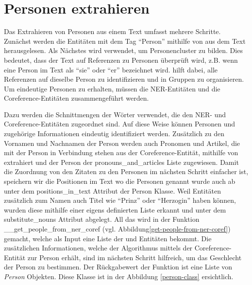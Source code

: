 \newpage
\section{Personen extrahieren}\label{people-extraction}


Das Extrahieren von Personen aus einem Text umfasst mehrere Schritte.
Zunächst werden die Entitäten mit dem Tag \enquote{Person} mithilfe von  aus dem Text herausgelesen.
Als Nächstes wird  verwendet, um Personencluster zu bilden. 
Dies bedeutet, dass der Text auf Referenzen zu Personen überprüft wird, z.B. wenn eine Person im Text als \enquote{sie} oder \enquote{er} bezeichnet wird. 
 hilft dabei, alle Referenzen auf dieselbe Person zu identifizieren und in Gruppen zu organisieren.
Um eindeutige Personen zu erhalten, müssen die NER-Entitäten und die Coreference-Entitäten zusammengeführt werden.

Dazu werden die Schnittmengen der Wörter verwendet, die den NER- und Coreference-Entitäten zugeordnet sind.
Auf diese Weise können Personen und zugehörige Informationen eindeutig identifiziert werden.
Zusätzlich zu den Vornamen und Nachnamen der Person werden auch Pronomen und Artikel, die mit der Person in Verbindung stehen aus der Coreference-Entität, mithilfe von  
extrahiert und der Person der pronouns\_and\_articles Liste zugewiesen. 
Damit die Zuordnung von den Zitaten zu den Personen im nächsten Schritt einfacher ist, speichern wir die Positionen im Text wo die Personen genannt wurde auch ab unter dem positions\_in\_text Attribut der Person Klasse.
Weil  Entitäten zusätzlich zum Namen auch Titel wie \enquote{Prinz} oder \enquote{Herzogin} haben können, 
wurden diese mithilfe einer eigens definierten Liste erkannt und unter dem substitute\_nouns Attribut abgelegt. 
All das wird in der Funktion \_\_get\_people\_from\_ner\_coref (vgl. Abbildung\ref{get-people-from-ner-coref}) gemacht, welche als Input eine Liste der  und  Entitäten bekommt.
Die zusätzlichen Informationen, welche der Algorithmus mittels der Coreference-Entität zur Person erhält, sind im nächsten Schritt hilfreich, um das Geschlecht der Person zu bestimmen.
Der Rückgabewert der Funktion ist eine Liste von \textsl{Person} Objekten. Diese Klasse ist in der Abbildung \ref{person-class} ersichtlich.

